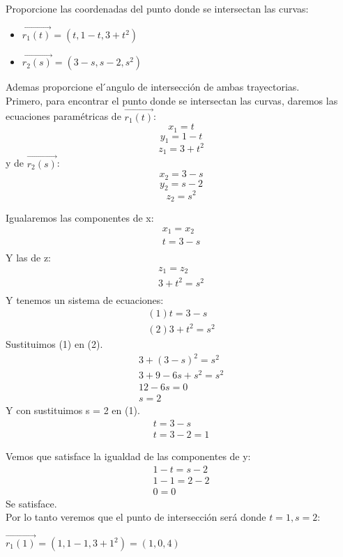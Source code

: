 \documentclass[12pt]{article}
\begin{document}
\section{}
Proporcione las coordenadas del punto donde se intersectan las curvas:
\begin{itemize}[format=\textbf]

\item $\vec{r_1(t)}=(t,1-t,3+t^2)$

\item $\vec{r_2(s)}=(3-s,s-2,s^2)$

\end{itemize}
Ademas proporcione el  ́angulo de intersección de ambas trayectorias.\\
Primero, para encontrar el punto donde se intersectan las curvas, daremos las ecuaciones paramétricas de $\vec{r_1(t)}$:
\[ x_1 = t\]
\[ y_1 = 1-t\]
\[ z_1 = 3+t^2\]
y de $\vec{r_2(s)}$:
\[ x_2 = 3-s\]
\[ y_2 = s-2\]
\[ z_2 = s^{2} \]

Igualaremos las componentes de x:
\begin{align*}
   x_1 = x_2 \\
   t =  3-s \\
\end{align*}
Y las de z:
\begin{align*}
   z_1 = z_2 \\
   3+t^2  =  s^{2} \\
\end{align*}
Y tenemos un sistema de ecuaciones:
\begin{align*}
  (1) t =  3-s \\
  (2) 3+t^2  =  s^{2}
\end{align*}
Sustituimos (1) en (2).
\begin{align*}
   3+(3-s)^2  =  s^{2} \\
   3+9-6s+s^2  =  s^{2} \\
   12 -6s =  0 \\
   s = 2
\end{align*}
Y con sustituimos s = 2 en (1).
\begin{align*}
   t =  3-s \\
  t = 3-2 = 1 
\end{align*}

Vemos que satisface la igualdad de las componentes de y:
\begin{align*}
   1-t = s-2 \\
   1-1  = 2-2 \\
   0 = 0
\end{align*}
Se satisface.\\
Por lo tanto veremos que el punto de intersección será donde $t=1, s=2$: \\
\item $\vec{r_1(1)}=(1,1-1,3+1^2) = (1, 0, 4)$
\end{document}
